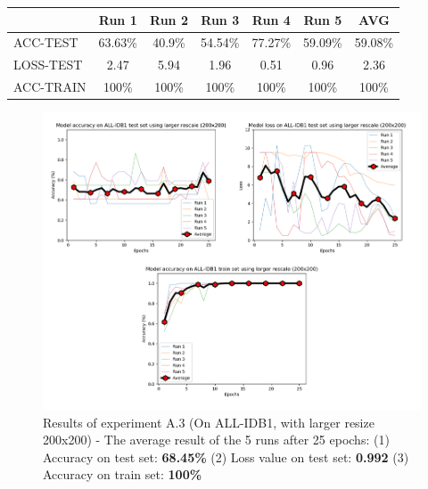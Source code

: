 \documentclass[11pt, openany]{report}
\theoremstyle{plain}
\theoremstyle{definition}
\theoremstyle{remark}
\begin{document}
\begin{center}
\begin{tabular}{|l|c|c|c|c|c|c|}
  \hline
   & \textbf{Run 1} & \textbf{Run 2} & \textbf{Run 3} & \textbf{Run 4} & \textbf{Run 5} & \textbf{AVG}\\
  \hline
  ACC-TEST & 63.63\% & 40.9\% & 54.54\% & 77.27\% & 59.09\% & 59.08\%\\
  LOSS-TEST & 2.47 & 5.94 & 1.96 & 0.51  & 0.96 & 2.36 \\ 
  ACC-TRAIN & 100\% & 100\% & 100\% & 100\% & 100\% & 100\% \\ 
  \hline
\end{tabular}
\label{table:results-A3}
\end{center}

\begin{figure}[H]
  \centering
  \includegraphics[scale=0.5]{Code/ch6-LeukemiaSubtypes/figures_result/ALL_IDB1/all_idb1-200x200.PNG}
  \caption{Results of experiment A.3 (On ALL-IDB1, with larger resize 200x200) - The average result of the 5 runs after 25 epochs: (1) Accuracy on test set: \textbf{68.45\%} (2) Loss value on test set: \textbf{0.992} (3) Accuracy on train set: \textbf{100\%}}
  \label{fig:results-A3}
\end{figure}
\end{document}
